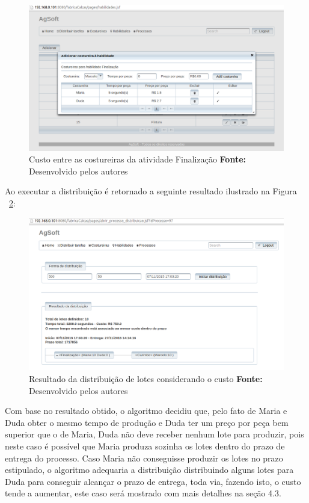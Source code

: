 \begin{figure}[h!]
	\centerline{\includegraphics[scale=0.4]{./imagens/custo_entre_costureiras_teste2.png}}
	\caption[Custo entre as costureiras atividade Finalização]
	{Custo entre as costureiras da atividade Finalização \textbf{Fonte:}
	Desenvolvido pelos autores}
	\label{fig:custo_entre_costureiras}
\end{figure}

\par Ao executar a distribuição é retornado a seguinte resultado ilustrado na Figura ~\ref{fig:resultado_custo}:

\newpage

\begin{figure}[h!]
	\centerline{\includegraphics[scale=0.4]{./imagens/resultado_teste2.png}}
	\caption[Resultado da distribuição de lotes considerando o custo]
	{Resultado da distribuição de lotes considerando o custo \textbf{Fonte:}
	Desenvolvido pelos autores}
	\label{fig:resultado_custo}
\end{figure}

\par Com base no resultado obtido, o algoritmo decidiu que, pelo fato de
Maria e Duda obter o mesmo tempo de produção e Duda ter um preço por peça
bem superior que o de Maria, Duda não deve receber nenhum lote para produzir, pois neste
caso é possível que Maria produza sozinha os lotes dentro do prazo de entrega do
processo. Caso Maria não conseguisse produzir os lotes no prazo estipulado, o
algoritmo adequaria a distribuição distribuindo alguns lotes para Duda para
conseguir alcançar o prazo de entrega, toda via, fazendo isto, o custo tende a
aumentar, este caso será mostrado com mais detalhes na seção 4.3.

